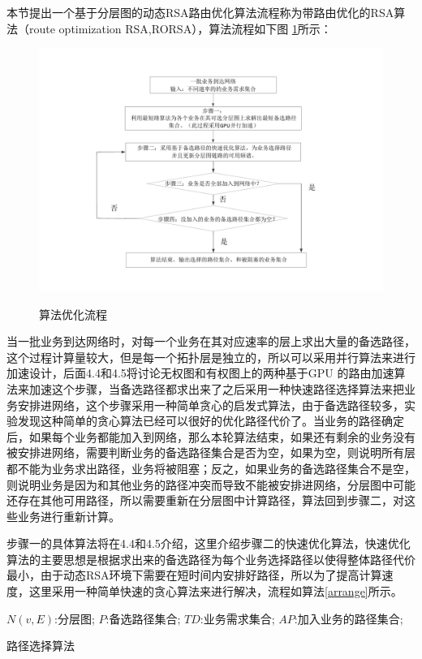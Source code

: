 本节提出一个基于分层图的动态RSA路由优化算法流程称为带路由优化的RSA算法（route optimization RSA,RORSA），算法流程如下图 \ref{bblayer}所示：
\begin{figure}
\setlength{\belowcaptionskip}{-0.5cm}
\begin{center}
{\includegraphics[width=1 \textwidth]{figures/bbprocess.pdf}}
\end{center}
\caption{{\footnotesize{算法优化流程}}}
\label{bblayer}
\end{figure}
当一批业务到达网络时，对每一个业务在其对应速率的层上求出大量的备选路径，这个过程计算量较大，但是每一个拓扑层是独立的，所以可以采用并行算法来进行加速设计，后面4.4和4.5将讨论无权图和有权图上的两种基于GPU 的路由加速算法来加速这个步骤，当备选路径都求出来了之后采用一种快速路径选择算法来把业务安排进网络，这个步骤采用一种简单贪心的启发式算法，由于备选路径较多，实验发现这种简单的贪心算法已经可以很好的优化路径代价了。当业务的路径确定后，如果每个业务都能加入到网络，那么本轮算法结束，如果还有剩余的业务没有被安排进网络，需要判断业务的备选路径集合是否为空，如果为空，则说明所有层都不能为业务求出路径，业务将被阻塞；反之，如果业务的备选路径集合不是空，则说明业务是因为和其他业务的路径冲突而导致不能被安排进网络，分层图中可能还存在其他可用路径，所以需要重新在分层图中计算路径，算法回到步骤二，对这些业务进行重新计算。

步骤一的具体算法将在4.4和4.5介绍，这里介绍步骤二的快速优化算法，快速优化算法的主要思想是根据求出来的备选路径为每个业务选择路径以使得整体路径代价最小，由于动态RSA环境下需要在短时间内安排好路径，所以为了提高计算速度，这里采用一种简单快速的贪心算法来进行解决，流程如算法\ref{arrange}所示。
\begin{algorithm}[htb]
\begin{algorithmic}[1]
\Require
$N(v,E)$:分层图;
$P$:备选路径集合;
$TD$:业务需求集合;
\Ensure
$AP$:加入业务的路径集合;
\EndFor
{}
\EndIf
\EndFor
\EndFor
\end{algorithmic}
\caption{路径选择算法}
\label{arrange}
\end{algorithm}


